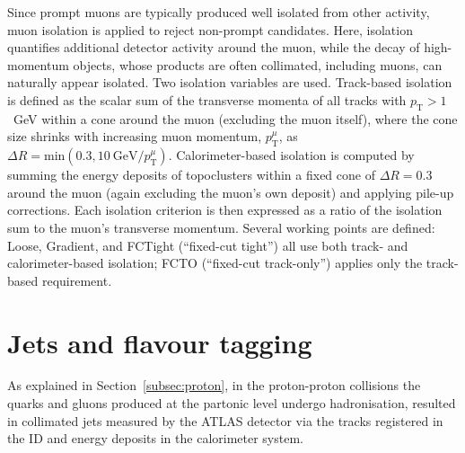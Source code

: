 Since prompt muons are typically produced well isolated from other activity, muon isolation is applied to reject non-prompt candidates. Here, isolation quantifies additional detector activity around the muon, while the decay of high-momentum objects, whose products are often collimated, including muons, can naturally appear isolated.
Two isolation variables are used. Track-based isolation is defined as the scalar sum of the transverse momenta of all tracks with $p_{\text{T}}>1$~GeV within a cone around the muon (excluding the muon itself), where the cone size shrinks with increasing muon momentum, $p^{\mu}_{\text{T}}$, as $\Delta R = \text{min}(0.3, 10~\text{GeV}/p^{\mu}_{\text{T}})$.
Calorimeter-based isolation is computed by summing the energy deposits of topoclusters within a fixed cone of $\Delta R=0.3$ around the muon (again excluding the muon’s own deposit) and applying pile-up corrections. Each isolation criterion is then expressed as a ratio of the isolation sum to the muon’s transverse momentum.
Several working points are defined: Loose, Gradient, and FCTight (“fixed-cut tight”) all use both track- and calorimeter-based isolation; FCTO (“fixed-cut track-only”) applies only the track-based requirement.

\section{Jets and flavour tagging}
\label{sec:jets}
As explained in Section~\ref{subsec:proton}, in the proton-proton collisions the quarks and gluons produced at the partonic level undergo hadronisation, resulted in collimated jets measured by the ATLAS detector via the tracks registered in the ID and energy deposits in the calorimeter system. 

